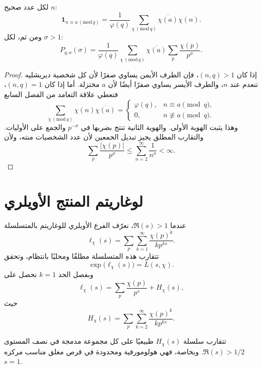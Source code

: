 \begin{proposition}
\label{prop:dirichlet-prime-class-filter}
\provedhere
لكل عدد صحيح \(n\):
\[
\mathbf 1_{n\equiv a\, (\mathrm{mod}\,q)}
=
\frac1{\varphi(q)}
\sum_{\chi\, (\mathrm{mod}\,q)}
\overline{\chi(a)}\chi(n).
\]
ومن ثم، لكل \(\sigma>1\):
\[
P_{q,a}(\sigma)
=
\frac1{\varphi(q)}
\sum_{\chi\, (\mathrm{mod}\,q)}
\overline{\chi(a)}
\sum_p\frac{\chi(p)}{p^\sigma}.
\]
\end{proposition}

\begin{proof}
إذا كان \((n,q)>1\)، فإن الطرف الأيمن يساوي صفرًا لأن كل شخصية ديريشليه
تنعدم عند \(n\)، والطرف الأيسر يساوي صفرًا أيضًا لأن \(a\) مختزلة.
أما إذا كان \((n,q)=1\)، فتعطي علاقة التعامد من الفصل السابع
\[
\sum_{\chi\, (\mathrm{mod}\,q)}
\chi(n)\overline{\chi(a)}
=
\begin{cases}
\varphi(q),&n\equiv a\pmod q,\\
0,&n\not\equiv a\pmod q.
\end{cases}
\]
وهذا يثبت الهوية الأولى. والهوية الثانية تنتج بضربها في \(p^{-\sigma}\)
والجمع على الأوليات. والتقارب المطلق يجيز تبديل الجمعين لأن عدد الشخصيات
منته، ولأن
\[
\sum_p\frac{|\chi(p)|}{p^\sigma}
\leq
\sum_{n=2}^{\infty}\frac1{n^\sigma}<\infty.
\]
\end{proof}

\section{لوغاريتم المنتج الأويلري}

عندما \(\Re(s)>1\)، نعرّف الفرع الأويلري للوغاريتم بالمتسلسلة
\[
\ell_\chi(s)
=
\sum_p\sum_{k=1}^{\infty}
\frac{\chi(p)^k}{k p^{ks}}.
\]
تتقارب هذه المتسلسلة مطلقًا ومحليًا بانتظام، وتحقق
\[
\exp\bigl(\ell_\chi(s)\bigr)=L(s,\chi).
\]
وبفصل الحد \(k=1\) نحصل على
\[
\ell_\chi(s)
=
\sum_p\frac{\chi(p)}{p^s}+H_\chi(s),
\]
حيث
\[
H_\chi(s)
=
\sum_p\sum_{k=2}^{\infty}
\frac{\chi(p)^k}{k p^{ks}}.
\]

\begin{lemma}
\label{lem:higher-prime-powers-remainder}
\provedhere
تتقارب سلسلة \(H_\chi(s)\) طبيعيًا على كل مجموعة مدمجة في نصف المستوى
\(\Re(s)>1/2\). وبخاصة، فهي هولومورفية ومحدودة في قرص مغلق مناسب مركزه
\(s=1\).
\end{lemma}

